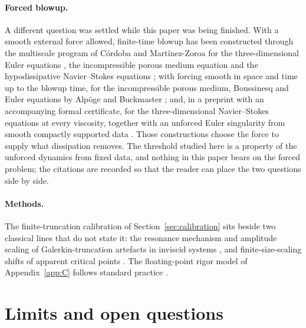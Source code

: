 \documentclass[11pt,a4paper]{article}
\theoremstyle{plain}
\theoremstyle{definition}
\begin{document}
\paragraph{Forced blowup.} A different question was settled while this paper was being finished. With a smooth external force allowed, finite-time blowup has been constructed through the multiscale program of Córdoba and Martínez-Zoroa for the three-dimensional Euler equations \cite{CMZ23}, the incompressible porous medium equation \cite{CMZ24} and the hypodissipative Navier--Stokes equations \cite{CMZZ26}; with forcing smooth in space and time up to the blowup time, for the incompressible porous medium, Boussinesq and Euler equations by Alpöge and Buckmaster \cite{AB26a,AB26b}; and, in a preprint with an accompanying formal certificate, for the three-dimensional Navier--Stokes equations at every viscosity, together with an unforced Euler singularity from smooth compactly supported data \cite{OAI26a,OAI26b}. Those constructions choose the force to supply what dissipation removes. The threshold studied here is a property of the unforced dynamics from fixed data, and nothing in this paper bears on the forced problem; the citations are recorded so that the reader can place the two questions side by side.

\paragraph{Methods.} The finite-truncation calibration of Section~\ref{sec:calibration} sits beside two classical lines that do not state it: the resonance mechanism and amplitude scaling of Galerkin-truncation artefacts in inviscid systems \cite{RF11}, and finite-size-scaling shifts of apparent critical points \cite{FF69}. The floating-point rigor model of Appendix~\ref{app:C} follows standard practice \cite{Hig02,Rum10,Joh17}.

\section{Limits and open questions}\label{sec:open}
\end{document}
